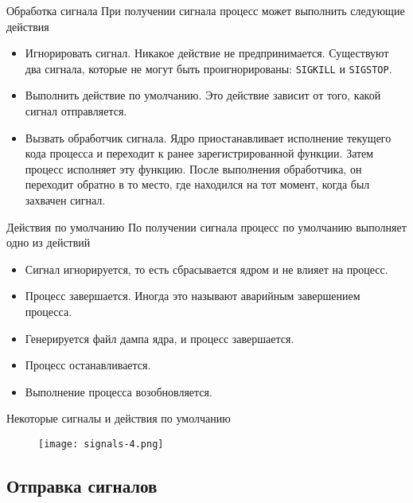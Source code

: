 \documentclass{beamer}
\begin{document}
\begin{frame}{Обработка сигнала}
    При получении сигнала процесс может выполнить следующие действия
    \begin{itemize}
        \item Игнорировать сигнал. Никакое действие не предпринимается. Существуют два сигнала, которые не могут быть проигнорированы: \texttt{SIGKILL} и \texttt{SIGSTOP}.
        \item Выполнить действие по умолчанию. Это действие зависит от того, какой сигнал отправляется.
        \item Вызвать обработчик сигнала. Ядро приостанавливает исполнение текущего кода процесса и переходит к ранее зарегистрированной функции. Затем процесс исполняет эту функцию. После выполнения обработчика, он переходит обратно в то место, где находился на тот момент, когда был захвачен сигнал.
    \end{itemize}
\end{frame}

\begin{frame}{Действия по умолчанию}
    По получении сигнала процесс по умолчанию выполняет одно из действий
    \begin{itemize}
        \item Сигнал игнорируется, то есть сбрасывается ядром и не влияет на процесс.
        \item Процесс завершается. Иногда это называют аварийным завершением процесса.
        \item Генерируется файл дампа ядра, и процесс завершается.
        \item Процесс останавливается.
        \item Выполнение процесса возобновляется.
    \end{itemize}
\end{frame}

\begin{frame}{Некоторые сигналы и действия по умолчанию}
    \begin{figure}
        \centering
        \texttt{[image: signals-4.png]}
    \end{figure}
\end{frame}

\subsection{Отправка сигналов}
\end{document}

